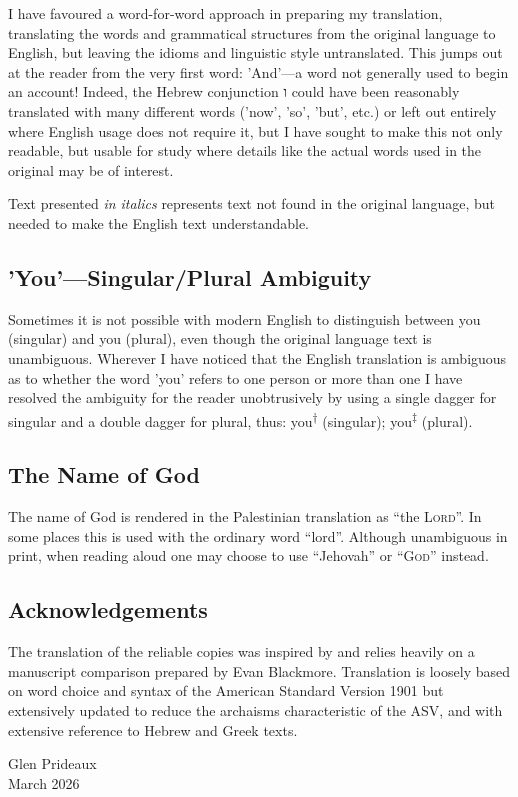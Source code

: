 {I have favoured a word-for-word approach in preparing my translation,
translating the words and grammatical structures from the original
language to English, but leaving the idioms and linguistic style
untranslated. This jumps out at the reader from the very first word:
'And'---a word not generally used to begin an account! Indeed, the
Hebrew conjunction \texthebrew{ו} could have been reasonably translated with many
different words ('now', 'so', 'but', etc.) or left out entirely where
English usage does not require it, but I have sought to make this not
only readable, but usable for study where details like the actual words
used in the original may be of interest.

Text presented \textit{in italics} represents text not found in the original
language, but needed to make the English text understandable.

\subsection*{'You'---Singular/Plural Ambiguity}

Sometimes it is not possible with modern English to distinguish between
you (singular) and you (plural), even though the original language text
is unambiguous. Wherever I have noticed that the English translation is
ambiguous as to whether the word 'you' refers to one person or more than
one I have resolved the ambiguity for the reader unobtrusively by using
a single dagger for singular and a double dagger for plural, thus:
you\textsuperscript{†} (singular); you\textsuperscript{‡} (plural).

\subsection*{The Name of God}

The name of God is rendered in the Palestinian translation as ``the \textsc{Lord}''. In some places this is
used with the ordinary word ``lord''. Although unambiguous in print,
when reading aloud one may choose to use ``Jehovah'' or
``\textsc{God}'' instead.

\subsection*{Acknowledgements}

The translation of the reliable copies was inspired by and relies heavily on a manuscript comparison
prepared by Evan Blackmore. Translation is loosely based on word choice
and syntax of the American Standard Version 1901 but extensively updated
to reduce the archaisms characteristic of the ASV, and with extensive
reference to Hebrew and Greek texts.

} %

\bigskip
\noindent Glen Prideaux\\
March 2026

